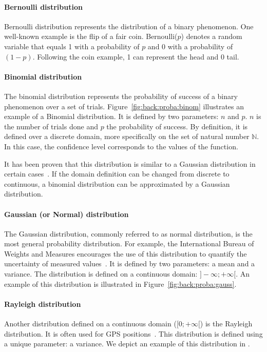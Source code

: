 \paragraph{Bernoulli distribution}
Bernoulli distribution represents the distribution of a binary phenomenon.
One well-known example is the flip of a fair coin.
Bernoulli($p$) denotes a random variable that equals 1 with a probability of $p$ and 0 with a probability of $(1 - p)$.
Following the coin example, 1 can represent the head and 0 tail.

\paragraph{Binomial distribution}
The binomial distribution represents the probability of success of a binary phenomenon over a set of trials.
Figure~\ref{fig:back:proba:binom} illustrates an example of a Binomial distribution.
It is defined by two parameters: $n$ and $p$.
$n$ is the number of trials done and $p$ the probability of success.
By definition, it is defined over a discrete domain, more specifically on the set of natural number $\mathds{N}$.
In this case, the confidence level corresponds to the values of the function.

It has been proven that this distribution is similar to a Gaussian distribution in certain cases~\cite{box2005}.
If the domain definition can be changed from discrete to continuous, a binomial distribution can be approximated by a Gaussian distribution. 

\paragraph{Gaussian (or Normal) distribution}
The Gaussian distribution, commonly referred to as normal distribution, is the most general probability distribution.
For example, the International Bureau of Weights and Measures encourages the use of this distribution to quantify the uncertainty of measured values~\cite{metrology2008evaluation}.
It is defined by two parameters: a mean and a variance.
The distribution is defined on a continuous domain: $]-\infty; +\infty[$.
An example of this distribution is illustrated in Figure~\ref{fig:back:proba:gauss}.

\paragraph{Rayleigh distribution}
Another distribution defined on a continuous domain ($[0; +\infty[$) is the Rayleigh distribution.
It is often used for GPS positions~\cite{bornholt2013abstractions}.
This distribution is defined using a unique parameter: a variance.
We depict an example of this distribution in .

